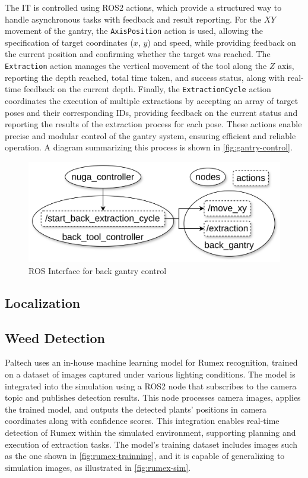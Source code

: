 The \ac{IT} is controlled using ROS$2$ actions, which provide a structured way to handle asynchronous tasks with feedback and result reporting. For the $XY$ movement of the gantry, the \texttt{AxisPosition} action is used, allowing the specification of target coordinates ($x$, $y$) and speed, while providing feedback on the current position and confirming whether the target was reached. The \texttt{Extraction} action manages the vertical movement of the tool along the $Z$ axis, reporting the depth reached, total time taken, and success status, along with real-time feedback on the current depth. Finally, the \texttt{ExtractionCycle} action coordinates the execution of multiple extractions by accepting an array of target poses and their corresponding IDs, providing feedback on the current status and reporting the results of the extraction process for each pose. These actions enable precise and modular control of the gantry system, ensuring efficient and reliable operation. A diagram summarizing this process is shown in \autoref{fig:gantry-control}.

\begin{figure}[h]
    \centering
    \includegraphics[width=0.7\linewidth]{gfx/ch03/gantry_control.png}
    \caption{ROS Interface for back gantry control}
    \label{fig:gantry-control}
\end{figure}


\subsection{Localization}
\lipsum[1]

\subsection{Weed Detection}
Paltech uses an in-house machine learning model for Rumex recognition, trained on a dataset of images captured under various lighting conditions. The model is integrated into the simulation using a ROS2 node that subscribes to the camera topic and publishes detection results. This node processes camera images, applies the trained model, and outputs the detected plants’ positions in camera coordinates along with confidence scores. This integration enables real-time detection of Rumex within the simulated environment, supporting planning and execution of extraction tasks. The model’s training dataset includes images such as the one shown in \autoref{fig:rumex-trainning}, and it is capable of generalizing to simulation images, as illustrated in \autoref{fig:rumex-sim}.

